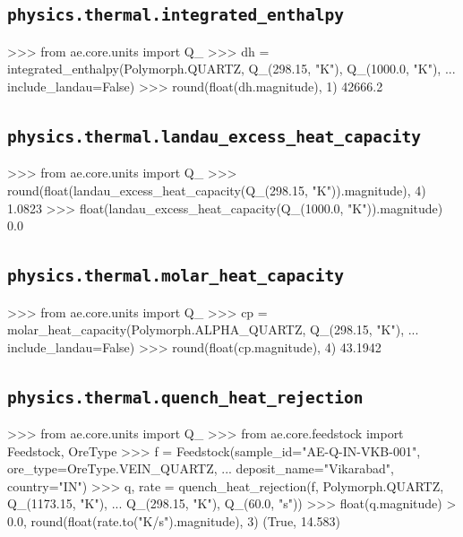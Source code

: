 \documentclass[10pt,a4paper,twoside]{report}
\begin{document}
\subsection*{\texttt{physics.thermal.integrated\_enthalpy}}

\begin{doctestblock}
>>> from ae.core.units import Q_
>>> dh = integrated_enthalpy(Polymorph.QUARTZ, Q_(298.15, "K"), Q_(1000.0, "K"),
...                          include_landau=False)
>>> round(float(dh.magnitude), 1)
42666.2
\end{doctestblock}

\subsection*{\texttt{physics.thermal.landau\_excess\_heat\_capacity}}

\begin{doctestblock}
>>> from ae.core.units import Q_
>>> round(float(landau_excess_heat_capacity(Q_(298.15, "K")).magnitude), 4)
1.0823
>>> float(landau_excess_heat_capacity(Q_(1000.0, "K")).magnitude)
0.0
\end{doctestblock}

\subsection*{\texttt{physics.thermal.molar\_heat\_capacity}}

\begin{doctestblock}
>>> from ae.core.units import Q_
>>> cp = molar_heat_capacity(Polymorph.ALPHA_QUARTZ, Q_(298.15, "K"),
...                          include_landau=False)
>>> round(float(cp.magnitude), 4)
43.1942
\end{doctestblock}

\subsection*{\texttt{physics.thermal.quench\_heat\_rejection}}

\begin{doctestblock}
>>> from ae.core.units import Q_
>>> from ae.core.feedstock import Feedstock, OreType
>>> f = Feedstock(sample_id="AE-Q-IN-VKB-001", ore_type=OreType.VEIN_QUARTZ,
...               deposit_name="Vikarabad", country="IN")
>>> q, rate = quench_heat_rejection(f, Polymorph.QUARTZ, Q_(1173.15, "K"),
...                                 Q_(298.15, "K"), Q_(60.0, "s"))
>>> float(q.magnitude) > 0.0, round(float(rate.to("K/s").magnitude), 3)
(True, 14.583)
\end{doctestblock}
\end{document}
